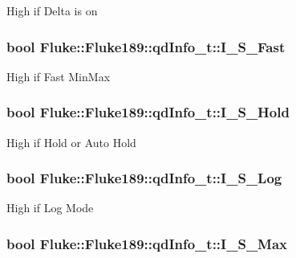 \label{structFluke_1_1Fluke189_1_1qdInfo__t_aed563d34e5b150077208fe97ee8dd47e}
High if Delta is on \hypertarget{structFluke_1_1Fluke189_1_1qdInfo__t_ae73230f4bccdb3e6c3008f12aa7bdb06}{
\subsubsection[{I\_\-S\_\-Fast}]{\setlength{\rightskip}{0pt plus 5cm}bool {\bf Fluke::Fluke189::qdInfo\_\-t::I\_\-S\_\-Fast}}}
\label{structFluke_1_1Fluke189_1_1qdInfo__t_ae73230f4bccdb3e6c3008f12aa7bdb06}
High if Fast MinMax \hypertarget{structFluke_1_1Fluke189_1_1qdInfo__t_a930c5fc401b77e853fc9f0db564637db}{
\subsubsection[{I\_\-S\_\-Hold}]{\setlength{\rightskip}{0pt plus 5cm}bool {\bf Fluke::Fluke189::qdInfo\_\-t::I\_\-S\_\-Hold}}}
\label{structFluke_1_1Fluke189_1_1qdInfo__t_a930c5fc401b77e853fc9f0db564637db}
High if Hold or Auto Hold \hypertarget{structFluke_1_1Fluke189_1_1qdInfo__t_a7dc8ea99bd7b62cd072ab9bbc50c6784}{
\subsubsection[{I\_\-S\_\-Log}]{\setlength{\rightskip}{0pt plus 5cm}bool {\bf Fluke::Fluke189::qdInfo\_\-t::I\_\-S\_\-Log}}}
\label{structFluke_1_1Fluke189_1_1qdInfo__t_a7dc8ea99bd7b62cd072ab9bbc50c6784}
High if Log Mode \hypertarget{structFluke_1_1Fluke189_1_1qdInfo__t_ab2c6db915334d26e1ae1e20e555d038f}{
\subsubsection[{I\_\-S\_\-Max}]{\setlength{\rightskip}{0pt plus 5cm}bool {\bf Fluke::Fluke189::qdInfo\_\-t::I\_\-S\_\-Max}}}
